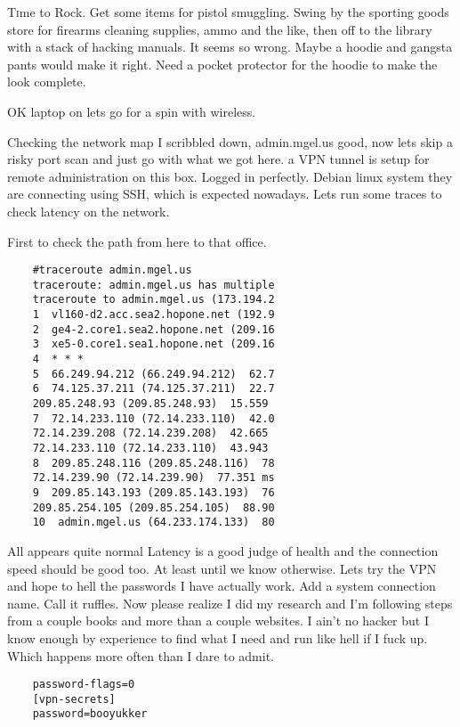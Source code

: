 \lettrine[lines=2,lraise=0]{T}ime to Rock. Get some items for pistol smuggling. Swing by the sporting goods store for firearms cleaning supplies, ammo and the like, then off to the library with a stack of hacking manuals. It seems so wrong. Maybe a hoodie and gangsta pants would make it right. Need a pocket protector for the hoodie to make the look complete.

OK laptop on lets go for a spin with wireless.

Checking the network map I scribbled down, admin.mgel.us good, now lets skip a risky port scan and just go with what we got here. a VPN tunnel is setup for remote administration on this box. Logged in perfectly. Debian linux system they are connecting using SSH, which is expected nowadays. Lets run some traces to check latency on the network.\\
\bigskip

First to check the path from here to that office.

\begin{verbatim}
	#traceroute admin.mgel.us
	traceroute: admin.mgel.us has multiple
	traceroute to admin.mgel.us (173.194.2
	1  vl160-d2.acc.sea2.hopone.net (192.9
	2  ge4-2.core1.sea2.hopone.net (209.16
	3  xe5-0.core1.sea1.hopone.net (209.16
	4  * * *
	5  66.249.94.212 (66.249.94.212)  62.7
	6  74.125.37.211 (74.125.37.211)  22.7
	209.85.248.93 (209.85.248.93)  15.559 
	7  72.14.233.110 (72.14.233.110)  42.0
	72.14.239.208 (72.14.239.208)  42.665 
	72.14.233.110 (72.14.233.110)  43.943 
	8  209.85.248.116 (209.85.248.116)  78
	72.14.239.90 (72.14.239.90)  77.351 ms
	9  209.85.143.193 (209.85.143.193)  76
	209.85.254.105 (209.85.254.105)  88.90
	10  admin.mgel.us (64.233.174.133)  80	
\end{verbatim}
\medskip

All appears quite normal Latency is a good judge of health and the connection speed should be good too. At least until we know otherwise. Lets try the VPN and hope to hell the passwords I have actually work. Add a system connection name. Call it ruffles. Now please realize I did my research and I'm following steps from a couple books and more than a couple websites. I ain't no hacker but I know enough by experience to find what I need and run like hell if I fuck up. Which happens more often than I dare to admit.

\begin{verbatim}
	password-flags=0
	[vpn-secrets]
	password=booyukker
\end{verbatim}
\medskip

